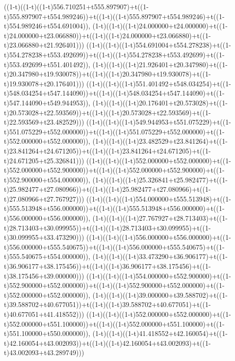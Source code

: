 ((1-t)((1-t)((1-t)556.710251+t555.897907)+t((1-t)555.897907+t554.989246))+t((1-t)((1-t)555.897907+t554.989246)+t((1-t)554.989246+t554.691004)),                                     (1-t)((1-t)((1-t)24.000000+t24.000000)+t((1-t)24.000000+t23.066880))+t((1-t)((1-t)24.000000+t23.066880)+t((1-t)23.066880+t21.926401)))
((1-t)((1-t)((1-t)554.691004+t554.278238)+t((1-t)554.278238+t553.492699))+t((1-t)((1-t)554.278238+t553.492699)+t((1-t)553.492699+t551.401492)),                                     (1-t)((1-t)((1-t)21.926401+t20.347980)+t((1-t)20.347980+t19.930078))+t((1-t)((1-t)20.347980+t19.930078)+t((1-t)19.930078+t20.176401)))
((1-t)((1-t)((1-t)551.401492+t548.034254)+t((1-t)548.034254+t547.144090))+t((1-t)((1-t)548.034254+t547.144090)+t((1-t)547.144090+t549.944953)),                                     (1-t)((1-t)((1-t)20.176401+t20.573028)+t((1-t)20.573028+t22.593569))+t((1-t)((1-t)20.573028+t22.593569)+t((1-t)22.593569+t23.482529)))
((1-t)((1-t)((1-t)549.944953+t551.075229)+t((1-t)551.075229+t552.000000))+t((1-t)((1-t)551.075229+t552.000000)+t((1-t)552.000000+t552.000000)),                                     (1-t)((1-t)((1-t)23.482529+t23.841264)+t((1-t)23.841264+t24.671205))+t((1-t)((1-t)23.841264+t24.671205)+t((1-t)24.671205+t25.326841)))
((1-t)((1-t)((1-t)552.000000+t552.000000)+t((1-t)552.000000+t552.900000))+t((1-t)((1-t)552.000000+t552.900000)+t((1-t)552.900000+t554.000000)),                                     (1-t)((1-t)((1-t)25.326841+t25.982477)+t((1-t)25.982477+t27.080966))+t((1-t)((1-t)25.982477+t27.080966)+t((1-t)27.080966+t27.767927)))
((1-t)((1-t)((1-t)554.000000+t555.513948)+t((1-t)555.513948+t556.000000))+t((1-t)((1-t)555.513948+t556.000000)+t((1-t)556.000000+t556.000000)),                                     (1-t)((1-t)((1-t)27.767927+t28.713403)+t((1-t)28.713403+t30.099955))+t((1-t)((1-t)28.713403+t30.099955)+t((1-t)30.099955+t33.473290)))
((1-t)((1-t)((1-t)556.000000+t556.000000)+t((1-t)556.000000+t555.540675))+t((1-t)((1-t)556.000000+t555.540675)+t((1-t)555.540675+t554.000000)),                                     (1-t)((1-t)((1-t)33.473290+t36.906177)+t((1-t)36.906177+t38.175456))+t((1-t)((1-t)36.906177+t38.175456)+t((1-t)38.175456+t39.000000)))
((1-t)((1-t)((1-t)554.000000+t552.900000)+t((1-t)552.900000+t552.000000))+t((1-t)((1-t)552.900000+t552.000000)+t((1-t)552.000000+t552.000000)),                                     (1-t)((1-t)((1-t)39.000000+t39.588702)+t((1-t)39.588702+t40.677051))+t((1-t)((1-t)39.588702+t40.677051)+t((1-t)40.677051+t41.418552)))
((1-t)((1-t)((1-t)552.000000+t552.000000)+t((1-t)552.000000+t551.100000))+t((1-t)((1-t)552.000000+t551.100000)+t((1-t)551.100000+t550.000000)),                                     (1-t)((1-t)((1-t)41.418552+t42.160054)+t((1-t)42.160054+t43.002093))+t((1-t)((1-t)42.160054+t43.002093)+t((1-t)43.002093+t43.289749)))
